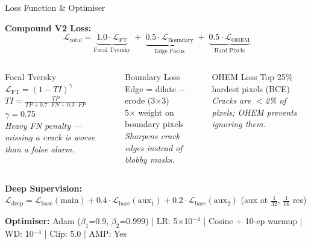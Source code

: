 \documentclass[aspectratio=169, 10pt]{beamer}
\begin{document}
\begin{frame}{Loss Function \& Optimiser}
\scriptsize

\textbf{Compound V2 Loss:}
\vspace{-0.5em}
\[
\mathcal{L}_{\text{total}} = \underbrace{1.0 \cdot \mathcal{L}_{\text{FT}}}_{\text{Focal Tversky}} \;+\; \underbrace{0.5 \cdot \mathcal{L}_{\text{Boundary}}}_{\text{Edge Focus}} \;+\; \underbrace{0.5 \cdot \mathcal{L}_{\text{OHEM}}}_{\text{Hard Pixels}}
\]
\vspace{-0.5em}

\begin{columns}[T]
\begin{block}{Focal Tversky}
$\mathcal{L}_{\text{FT}} = (1 - TI)^\gamma$\\[0.1em]
$TI = \frac{TP}{TP + 0.7{\cdot}FN + 0.3{\cdot}FP}$\\[0.1em]
$\gamma = 0.75$ \\[0.1em]
\textit{Heavy FN penalty --- missing a crack is worse than a false alarm.}
\end{block}

\begin{block}{Boundary Loss}
Edge = dilate $-$ erode (3$\times$3)\\[0.1em]
5$\times$ weight on boundary pixels\\[0.1em]
\textit{Sharpens crack edges instead of blobby masks.}
\end{block}

\begin{block}{OHEM Loss}
Top 25\% hardest pixels (BCE)\\[0.1em]
\textit{Cracks are $<$2\% of pixels; OHEM prevents ignoring them.}
\end{block}
\end{columns}

\medskip
\textbf{Deep Supervision:}
$\mathcal{L}_{\text{deep}} = \mathcal{L}_{\text{base}}(\text{main}) + 0.4 \cdot \mathcal{L}_{\text{base}}(\text{aux}_1) + 0.2 \cdot \mathcal{L}_{\text{base}}(\text{aux}_2)$
\; (aux at $\frac{1}{32}$, $\frac{1}{16}$ res)

\smallskip
\textbf{Optimiser:} Adam ($\beta_1$=0.9, $\beta_2$=0.999)
\;|\; LR: 5$\times$10$^{-4}$
\;|\; Cosine + 10-ep warmup
\;|\; WD: 10$^{-4}$
\;|\; Clip: 5.0
\;|\; AMP: Yes

\end{frame}
\end{document}
